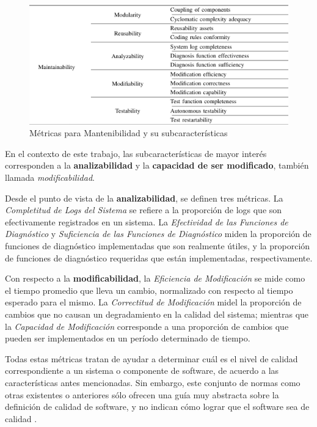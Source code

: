 \begin{figure}[H]
    \label{Metrics}
    \includegraphics[width=12cm]{quality_metrics/quality_metrics.png}
    \centering
    \caption{Métricas para Mantenibilidad y su subcaracterísticas}
\end{figure}

En el contexto de este trabajo, las subcaracterísticas de mayor interés corresponden
a la \textbf{analizabilidad} y la \textbf{capacidad de ser modificado}, también llamada
\textit{modificabilidad}.

Desde el punto de vista de la \textbf{analizabilidad}, se definen tres métricas.
La \textit{Completitud de Logs del Sistema} se refiere a la proporción de logs que son
efectivamente registrados en un sistema.
La \textit{Efectividad de las Funciones de Diagnóstico} y \textit{Suficiencia de las
Funciones de Diagnóstico} miden la proporción de funciones de diagnóstico implementadas que
son realmente útiles, y la proporción de funciones de diagnóstico requeridas que están
implementadas, respectivamente.

Con respecto a la \textbf{modificabilidad}, la \textit{Eficiencia de Modificación} se mide
como el tiempo promedio que lleva un cambio, normalizado con respecto al tiempo esperado
para el mismo.
La \textit{Correctitud de Modificación} midel la proporción de cambios que no causan un
degradamiento en la calidad del sistema; mientras que la \textit{Capacidad de Modificación}
corresponde a una proporción de cambios que pueden ser implementados en un período determinado
de tiempo.

Todas estas métricas tratan de ayudar a determinar cuál es el nivel de calidad correspondiente a
un sistema o componente de software, de acuerdo a las características antes mencionadas.
Sin embargo, este conjunto de normas como otras existentes o anteriores sólo ofrecen una
guía muy abstracta sobre la definición de calidad de software, y no indican cómo lograr
que el software sea de calidad \cite{Relf04}.

